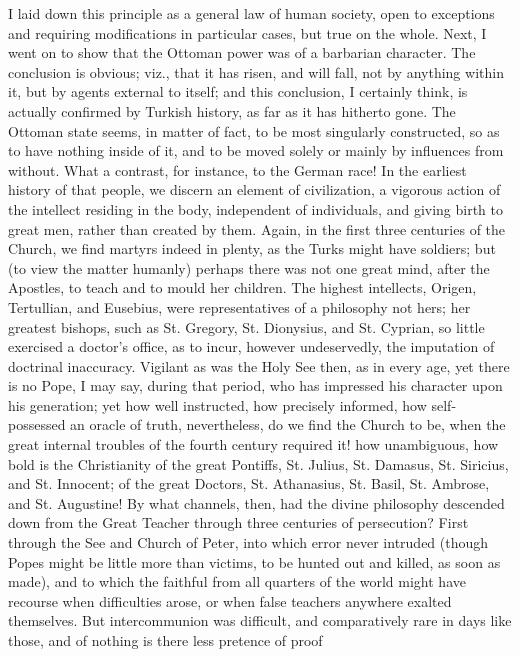 I laid down this principle as
a general law of human society, open to exceptions and requiring
modifications in particular cases, but true on the whole. Next, I went
on to show that the Ottoman power was of a barbarian character. The
conclusion is obvious; viz., that it has risen, and will fall, not by
anything within it, but by agents external to itself; and this
conclusion, I certainly think, is actually confirmed by Turkish
history, as far as it has hitherto gone. The Ottoman state seems, in
matter of fact, to be most singularly constructed, so as to have
nothing inside of it, and to be moved solely or mainly by influences
from without. What a contrast, for instance, to the German race! In
the earliest history of that people, we discern an element of
civilization, a vigorous action of the intellect residing in the body,
independent of individuals, and giving birth to great men, rather than
created by them. Again, in the first three centuries of the Church, we
find martyrs indeed in plenty, as the Turks might have soldiers; but
(to view the matter humanly) perhaps there was not one great mind,
after the Apostles, to teach and to mould her children. The highest
intellects, Origen, Tertullian, and Eusebius, were representatives of
a philosophy not hers; her greatest bishops, such as St. Gregory, St.
Dionysius, and St. Cyprian, so little exercised a doctor's office, as to incur, however undeservedly, the imputation of doctrinal
inaccuracy. Vigilant as was the Holy See then, as in every age, yet
there is no Pope, I may say, during that period, who has impressed his
character upon his generation; yet how well instructed, how precisely
informed, how self-possessed an oracle of truth, nevertheless, do we
find the Church to be, when the great internal troubles of the fourth
century required it! how unambiguous, how bold is the Christianity of
the great Pontiffs, St. Julius, St. Damasus, St. Siricius, and St.
Innocent; of the great Doctors, St. Athanasius, St. Basil, St.
Ambrose, and St. Augustine! By what channels, then, had the divine
philosophy descended down from the Great Teacher through three
centuries of persecution? First through the See and Church of Peter,
into which error never intruded (though Popes might be little more
than victims, to be hunted out and killed, as soon as made), and to
which the faithful from all quarters of the world might have recourse
when difficulties arose, or when false teachers anywhere exalted
themselves. But intercommunion was difficult, and comparatively rare
in days like those, and of nothing is there less pretence of proof
